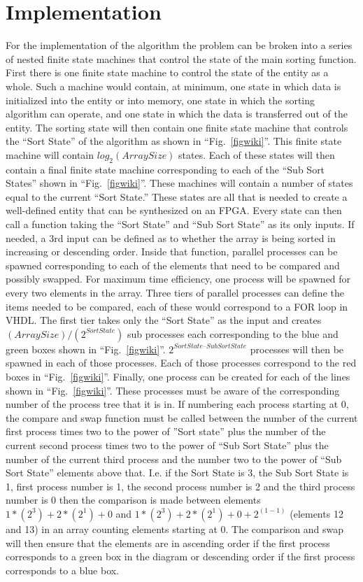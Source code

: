 \documentclass[conference]{IEEEtran}
\begin{document}
\section*{Implementation}
For the implementation of the algorithm the problem can be broken into a series of nested finite state machines that control the state of the main sorting function. First there is one finite state machine to control the state of the entity as a whole. Such a machine would contain, at minimum, one state in which data is initialized into the entity or into memory, one state in which the sorting algorithm can operate, and one state in which the data is transferred out of the entity. The sorting state will then contain one finite state machine that controls the “Sort State” of the algorithm as shown in ``Fig.~\ref{figwiki}''. This finite state machine will contain \(log_2(Array Size)\) states. Each of these states will then contain a final finite state machine corresponding to each of the “Sub Sort States” shown in ``Fig.~\ref{figwiki}''. These machines will contain a number of states equal to the current “Sort State.” These states are all that is needed to create a well-defined entity that can be synthesized on an FPGA. Every state can then call a function taking the “Sort State” and “Sub Sort State” as its only inputs. If needed, a 3rd input can be defined as to whether the array is being sorted in increasing or descending order. Inside that function, parallel processes can be spawned corresponding to each of the elements that need to be compared and possibly swapped. For maximum time efficiency, one process will be spawned for every two elements in the array. Three tiers of parallel processes can define the items needed to be compared, each of these would correspond to a FOR loop in VHDL. The first tier takes only the “Sort State” as the input and creates \((Array Size)/(2^{Sort State})\) sub processes each corresponding to the blue and green boxes shown in ``Fig.~\ref{figwiki}''. \(2^{Sort State – Sub Sort State}\) processes will then be spawned in each of those processes. Each of those processes correspond to the red boxes in ``Fig.~\ref{figwiki}''. Finally, one process can be created for each of the lines shown in ``Fig.~\ref{figwiki}''. These processes must be aware of the corresponding number of the process tree that it is in. If numbering each process starting at 0, the compare and swap function must be called between the number of the current first process times two to the power of ”Sort state” plus the number of the current second process times two to the power of “Sub Sort State” plus the number of the current third process and the number two to the power of “Sub Sort State” elements above that. I.e. if the Sort State is 3, the Sub Sort State is 1, first process number is 1, the second process number is 2 and the third process number is 0 then the comparison is made between elements \(1*(2^3)+2*(2^1)+0\) and \(1*(2^3)+2*(2^1)+0+2^(1-1)\) (elements 12 and 13) in an array counting elements starting at 0. The comparison and swap will then ensure that the elements are in ascending order if the first process corresponds to a green box in the diagram or descending order if the first process corresponds to a blue box.
\end{document}
